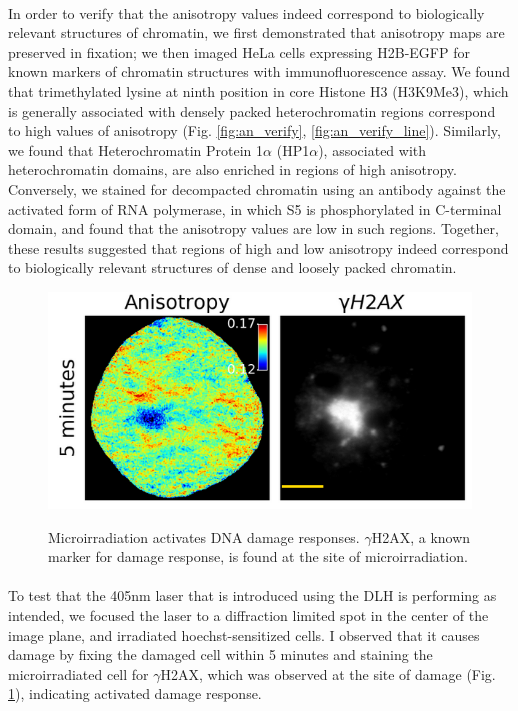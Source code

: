 \paragraph*{} In order to verify that the anisotropy values indeed correspond to biologically relevant structures of chromatin, we first demonstrated that anisotropy maps are preserved in fixation; we then imaged HeLa cells expressing H2B-EGFP for known markers of chromatin structures with immunofluorescence assay. We found that trimethylated lysine at ninth position in core Histone H3 (H3K9Me3), which is generally associated with densely packed heterochromatin regions correspond to high values of anisotropy (Fig. \ref{fig:an_verify}, \ref{fig:an_verify_line}). Similarly, we found that Heterochromatin Protein 1$\alpha$ (HP1$\alpha$), associated with heterochromatin domains, are also enriched in regions of high anisotropy. Conversely, we stained for decompacted chromatin using an antibody against the activated form of RNA polymerase, in which S5 is phosphorylated in C-terminal domain, and found that the anisotropy values are low in such regions. Together, these results suggested that regions of high and low anisotropy indeed correspond to biologically relevant structures of dense and loosely packed chromatin.  

\begin{figure}[H]
    {\hfill\includegraphics[clip,width=0.8\linewidth]{figures/micro_gh2ax.png}\hspace*{\fill}}
    \caption{Microirradiation activates DNA damage responses. $\gamma$H2AX, a known marker for damage response, is found at the site of microirradiation.}
    {\label{fig:micro_gh2ax}}
\end{figure}

\paragraph*{} To test that the 405nm laser that is introduced using the DLH is performing as intended, we focused the laser to a diffraction limited spot in the center of the image plane, and irradiated hoechst-sensitized cells. I observed that it causes damage by fixing the damaged cell within 5 minutes and staining the microirradiated cell for $\gamma$H2AX, which was observed at the site of damage (Fig. {\ref{fig:micro_gh2ax}}), indicating activated damage response.

